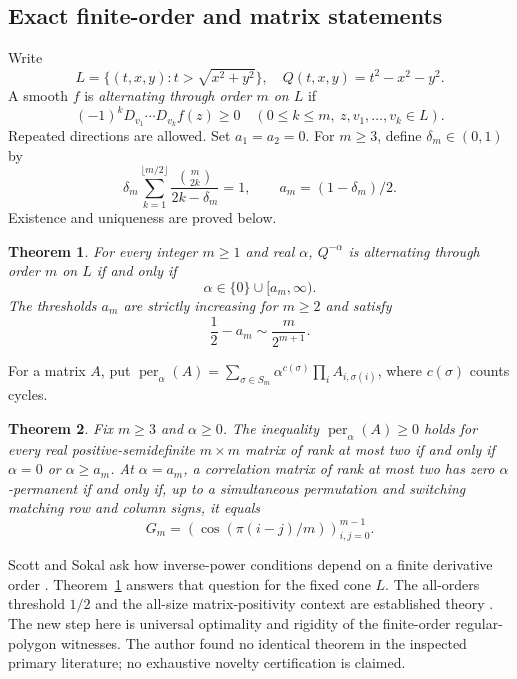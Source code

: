 \documentclass[11pt,a4paper]{article}
\newtheorem{theorem}{Theorem}[section]
\theoremstyle{definition}\newtheorem{definition}[theorem]{Definition}
\theoremstyle{remark}\newtheorem{remark}[theorem]{Remark}
\numberwithin{equation}{section}
\begin{document}
\subsection{Exact finite-order and matrix statements}\label{S08-sec-1}
Write
\[
 L=\{(t,x,y):t>\sqrt{x^2+y^2}\},\quad Q(t,x,y)=t^2-x^2-y^2.
\]
A smooth $f$ is \emph{alternating through order $m$ on $L$} if
\[
 (-1)^kD_{v_1}\cdots D_{v_k}f(z)\ge0
 \quad(0\le k\le m,\ z,v_1,\ldots,v_k\in L).
\]
Repeated directions are allowed. Set $a_1=a_2=0$. For $m\ge3$, define $\delta_m\in(0,1)$ by
\begin{equation}\label{S08-root}
 \delta_m\sum_{k=1}^{\lfloor m/2\rfloor}
 \frac{\binom m{2k}}{2k-\delta_m}=1,
 \qquad a_m=(1-\delta_m)/2.
\end{equation}
Existence and uniqueness are proved below.
\begin{theorem}\label{S08-main}
For every integer $m\ge1$ and real $\alpha$, $Q^{-\alpha}$ is alternating through order $m$ on $L$ if and only if
\[
 \alpha\in\{0\}\cup[a_m,\infty).
\]
The thresholds $a_m$ are strictly increasing for $m\ge2$ and satisfy
\[
 \frac12-a_m\sim\frac{m}{2^{m+1}}.
\]
\end{theorem}
For a matrix $A$, put $\operatorname{per}_\alpha(A)=\sum_{\sigma\in S_m}\alpha^{c(\sigma)}\prod_iA_{i,\sigma(i)}$, where $c(\sigma)$ counts cycles.
\begin{theorem}\label{S08-matrix}
Fix $m\ge3$ and $\alpha\ge0$. The inequality $\operatorname{per}_\alpha(A)\ge0$ holds for every real positive-semidefinite $m\times m$ matrix of rank at most two if and only if $\alpha=0$ or $\alpha\ge a_m$.
At $\alpha=a_m$, a correlation matrix of rank at most two has zero $\alpha$-permanent if and only if, up to a simultaneous permutation and switching matching row and column signs, it equals
\[
 G_m=(\cos(\pi(i-j)/m))_{i,j=0}^{m-1}.
\]
\end{theorem}
Scott and Sokal ask how inverse-power conditions depend on a finite derivative order \cite[Section 1.5]{ref005}. Theorem~\ref{S08-main} answers that question for the fixed cone $L$. The all-orders threshold $1/2$ and the all-size matrix-positivity context are established theory \cite{ref005,ref009}. The new step here is universal optimality and rigidity of the finite-order regular-polygon witnesses. The author found no identical theorem in the inspected primary literature; no exhaustive novelty certification is claimed.
\end{document}
